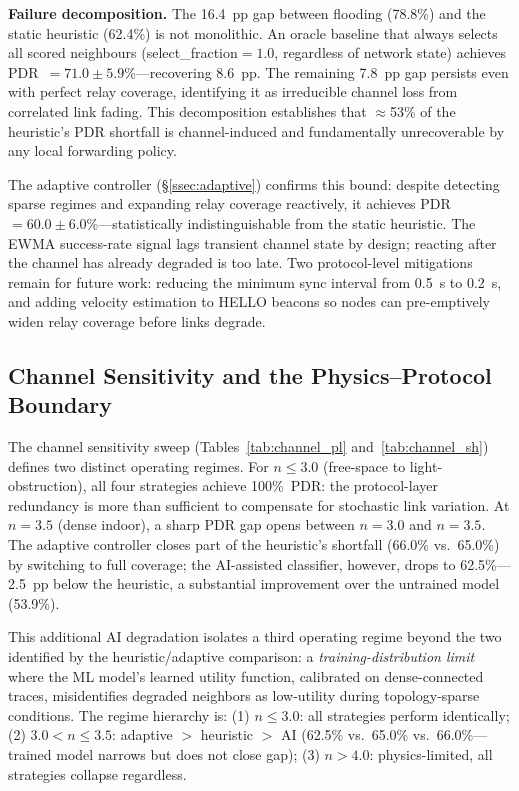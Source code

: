 \documentclass[conference]{IEEEtran}
\begin{document}
\textbf{Failure decomposition.}  The 16.4~pp gap between flooding (78.8\%) and
the static heuristic (62.4\%) is not monolithic.  An oracle baseline that always
selects all scored neighbours (select\_fraction$=1.0$, regardless of network state)
achieves PDR~$=71.0\pm5.9$\%---recovering 8.6~pp.  The remaining 7.8~pp gap
persists even with perfect relay coverage, identifying it as irreducible channel
loss from correlated link fading.  This decomposition establishes that
$\approx$53\% of the heuristic's PDR shortfall is channel-induced and
fundamentally unrecoverable by any local forwarding policy.

The adaptive controller (§\ref{ssec:adaptive}) confirms this bound: despite
detecting sparse regimes and expanding relay coverage reactively, it achieves
PDR~$=60.0\pm6.0$\%---statistically indistinguishable from the static heuristic.
The EWMA success-rate signal lags transient channel state by design; reacting
after the channel has already degraded is too late.  Two protocol-level
mitigations remain for future work: reducing the minimum sync interval from
0.5~s to 0.2~s, and adding velocity estimation to HELLO beacons so nodes can
pre-emptively widen relay coverage before links degrade.

\subsection{Channel Sensitivity and the Physics--Protocol Boundary}
The channel sensitivity sweep (Tables~\ref{tab:channel_pl} and~\ref{tab:channel_sh})
defines two distinct operating regimes.  For $n \leq 3.0$ (free-space to
light-obstruction), all four strategies achieve 100\%~PDR: the
protocol-layer redundancy is more than sufficient to compensate for
stochastic link variation.  At $n=3.5$ (dense indoor), a sharp PDR gap
opens between $n=3.0$ and $n=3.5$.  The adaptive controller closes
part of the heuristic's shortfall (66.0\% vs.\ 65.0\%) by switching to
full coverage; the AI-assisted classifier, however, drops to 62.5\%---
2.5~pp below the heuristic, a substantial improvement over the untrained model (53.9\%).

This additional AI degradation isolates a third operating regime beyond
the two identified by the heuristic/adaptive comparison: a
\emph{training-distribution limit} where the ML model's learned utility
function, calibrated on dense-connected traces, misidentifies degraded
neighbors as low-utility during topology-sparse conditions.  The regime
hierarchy is: (1) $n \leq 3.0$: all strategies perform identically;
(2) $3.0 < n \leq 3.5$: adaptive $>$ heuristic $>$ AI (62.5\% vs.\ 65.0\% vs.\ 66.0\%---trained model narrows but does not close gap);
(3) $n > 4.0$: physics-limited, all strategies collapse regardless.
\end{document}
